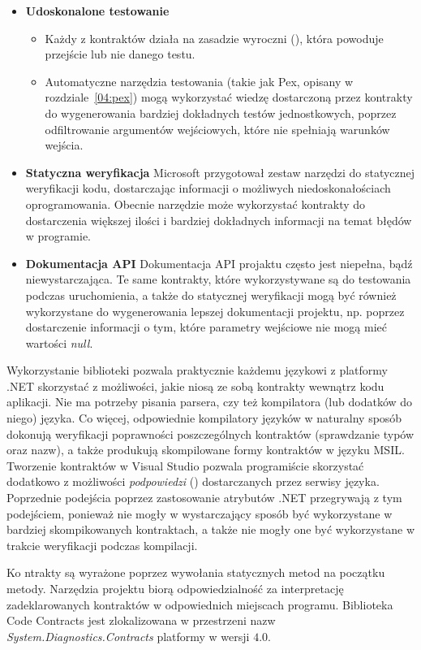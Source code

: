 \begin{itemize}
	\item \textbf{Udoskonalone testowanie}
		\begin{itemize}
			\item Każdy z kontraktów działa na zasadzie wyroczni (), która powoduje przejście lub nie danego testu.
			\item Automatyczne narzędzia testowania (takie jak Pex, opisany w rozdziale~\ref{04:pex}) mogą wykorzystać wiedzę dostarczoną przez kontrakty do wygenerowania bardziej dokładnych testów jednostkowych, poprzez odfiltrowanie argumentów wejściowych, które nie spełniają warunków wejścia.
		\end{itemize}
	\item \textbf{Statyczna weryfikacja}
		Microsoft przygotował zestaw narzędzi do statycznej weryfikacji kodu, dostarczając informacji o możliwych niedoskonałościach oprogramowania. Obecnie narzędzie może wykorzystać kontrakty do dostarczenia większej ilości i bardziej dokładnych informacji na temat błędów w programie.
	\item \textbf{Dokumentacja API}
		Dokumentacja API projaktu często jest niepełna, bądź niewystarczająca. Te same kontrakty, które wykorzystywane są do testowania podczas uruchomienia, a także do statycznej weryfikacji mogą być również wykorzystane do wygenerowania lepszej dokumentacji projektu, np. poprzez dostarczenie informacji o tym, które parametry wejściowe nie mogą mieć wartości \emph{null}.
\end{itemize}

Wykorzystanie biblioteki pozwala praktycznie każdemu językowi z platformy .NET skorzystać z możliwości, jakie niosą ze sobą kontrakty wewnątrz kodu aplikacji. Nie ma potrzeby pisania parsera, czy też kompilatora (lub dodatków do niego) języka. Co więcej, odpowiednie kompilatory języków w naturalny sposób dokonują weryfikacji poprawności poszczególnych kontraktów (sprawdzanie typów oraz nazw), a także produkują skompilowane formy kontraktów w języku MSIL. Tworzenie kontraktów w Visual Studio pozwala programiście skorzystać dodatkowo z możliwości \emph{podpowiedzi} () dostarczanych przez serwisy języka. Poprzednie podejścia poprzez zastosowanie atrybutów .NET przegrywają z tym podejściem, ponieważ nie mogły w wystarczający sposób być wykorzystane w bardziej skompikowanych kontraktach, a także nie mogły one być wykorzystane w trakcie weryfikacji podczas kompilacji.

Ko ntrakty są wyrażone poprzez wywołania statycznych metod na początku metody. Narzędzia projektu biorą odpowiedzialność za interpretację zadeklarowanych kontraktów w odpowiednich miejscach programu. Biblioteka Code Contracts jest zlokalizowana w przestrzeni nazw \emph{System.Diagnostics.Contracts} platformy w wersji $4.0$.

